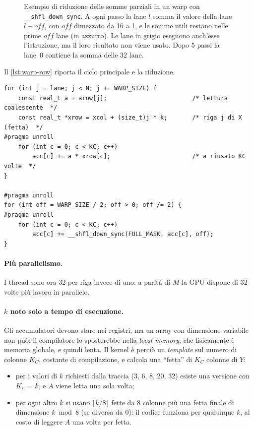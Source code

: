 \documentclass[11pt,a4paper]{article}
\begin{document}
\begin{figure}[H]
{%
  }
  \caption{Esempio di riduzione delle somme parziali in un warp con
    \texttt{\_\_shfl\_down\_sync}. A ogni passo la lane $l$ somma il valore
    della lane $l + \mathit{off}$, con $\mathit{off}$ dimezzato da 16 a 1, e le somme utili restano nelle prime $\mathit{off}$ lane (in azzurro). Le lane
    in grigio eseguono anch'esse l'istruzione, ma il loro risultato non viene
    usato. Dopo 5 passi la lane~0 contiene la somma delle 32
    lane.}\label{fig:shfl}
\end{figure}

Il \cref{lst:warp-row} riporta il ciclo principale e la riduzione.

\begin{lstlisting}[caption={Ciclo principale e riduzione nel warp di \texttt{warp\_row} (\texttt{kernel\_warp\_row.cu}).}, label={lst:warp-row}]
for (int j = lane; j < N; j += WARP_SIZE) {
    const real_t a = arow[j];                        /* lettura coalescente  */
    const real_t *xrow = xcol + (size_t)j * k;       /* riga j di X (fetta)  */
#pragma unroll
    for (int c = 0; c < KC; c++)
        acc[c] += a * xrow[c];                       /* a riusato KC volte  */
}

#pragma unroll
for (int off = WARP_SIZE / 2; off > 0; off /= 2) {
#pragma unroll
    for (int c = 0; c < KC; c++)
        acc[c] += __shfl_down_sync(FULL_MASK, acc[c], off);
}
\end{lstlisting}

\paragraph{Più parallelismo.} I thread sono ora 32 per riga invece di uno: a
parità di $M$ la GPU dispone di 32 volte più lavoro in parallelo.

\paragraph{$k$ noto solo a tempo di esecuzione.} Gli accumulatori devono stare
nei registri, ma un array con dimensione variabile non può: il compilatore lo
sposterebbe nella \emph{local memory}, che fisicamente è memoria globale, e
quindi lenta. Il kernel è perciò un \emph{template} sul numero di colonne
$K_C$, costante di compilazione, e calcola una ``fetta'' di $K_C$ colonne di
$Y$:
\begin{itemize}
  \item per i valori di $k$ richiesti dalla traccia (3, 6, 8, 20, 32) esiste
        una versione con $K_C = k$, e $A$ viene letta una sola volta;
  \item per ogni altro $k$ si usano $\lfloor k/8 \rfloor$ fette da 8 colonne più una fetta finale di dimensione $k \bmod 8$ (se diversa da 0): il codice funziona per qualunque $k$, al costo di leggere $A$
        una volta per fetta.
\end{itemize}
\end{document}
